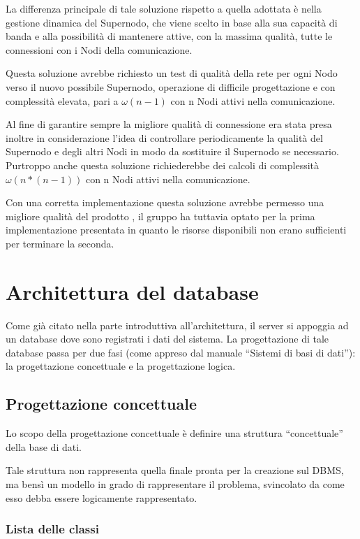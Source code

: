 La differenza principale di tale soluzione rispetto a quella adottata è nella gestione dinamica del Supernodo, che viene scelto in base alla sua capacità di banda e alla possibilità di mantenere attive, con la massima qualità, tutte le connessioni con i Nodi della comunicazione.

Questa soluzione avrebbe richiesto un test di qualità della rete per ogni Nodo verso il nuovo possibile Supernodo, operazione di difficile progettazione e con complessità elevata, pari a $\omega(n-1)$ con n Nodi attivi nella comunicazione.

Al fine di garantire sempre la migliore qualità di connessione era stata presa inoltre in considerazione l'idea di controllare periodicamente la qualità del Supernodo e degli altri Nodi in modo da sostituire il Supernodo se necessario. Purtroppo anche questa soluzione richiederebbe dei calcoli di complessità $\omega(n*(n-1))$ con n Nodi attivi nella comunicazione.

Con una corretta implementazione questa soluzione avrebbe permesso una migliore qualità del prodotto \caName, il gruppo ha tuttavia optato per la prima implementazione presentata in quanto le risorse disponibili non erano sufficienti per terminare la seconda.
\clearpage

\section{Architettura del database}\label{sec:database}

Come già citato nella parte introduttiva all'architettura, il server si appoggia ad un database dove sono registrati i dati del sistema. La progettazione di tale database passa per due fasi (come appreso dal manuale ``Sistemi di basi di dati''): la progettazione concettuale e la progettazione logica.

\subsection{Progettazione concettuale}
Lo scopo della progettazione concettuale è definire una struttura ``concettuale'' della base di dati.

Tale struttura non rappresenta quella finale pronta per la creazione sul DBMS, ma bensì un modello in grado di rappresentare il problema, svincolato da come esso debba essere logicamente rappresentato.

\subsubsection{Lista delle classi}

